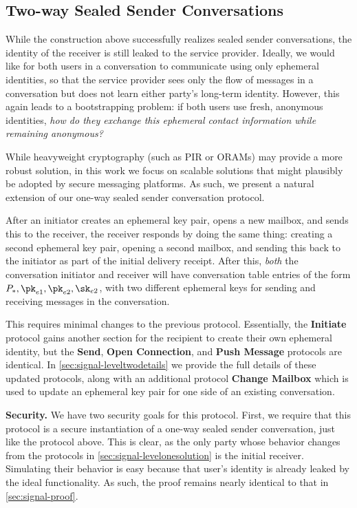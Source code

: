 \subsection{Two-way Sealed Sender Conversations}
\label{sec:signal-leveltwosolution}


While the construction above successfully realizes sealed sender
conversations,
the identity of the receiver is still leaked to
the service provider.  Ideally, we would like for both users in a
conversation to communicate using only ephemeral identities, so that
the service provider sees only the flow of messages in a conversation
but does not learn either party's long-term identity.
However, this again leads to a bootstrapping problem: if
both users use fresh, anonymous identities, {\em how do they exchange
this ephemeral contact information while remaining anonymous?} 

While heavyweight cryptography (such as PIR or ORAMs)
may provide a more robust solution,
in this work we focus on scalable solutions that might plausibly be
adopted by secure messaging platforms.  As such, we present a natural
extension of our one-way sealed sender conversation protocol.

After an initiator creates an ephemeral key pair, opens a new mailbox,
and sends this to the
receiver, the receiver responds by doing the same thing: creating a
second ephemeral key pair, opening a second mailbox, and sending this
back to the initiator as part of the initial delivery receipt. After
this, \emph{both} the conversation initiator and receiver will have
conversation table entries of the form
\(\personx, \pk_{e1}, \pk_{e2}, \sk_{e2}\), with two different ephemeral
keys for sending and receiving messages in the conversation.

This requires minimal changes to the previous protocol. Essentially, the
\textbf{Initiate} protocol gains another section for the recipient to
create their own ephemeral identity, but the \textbf{Send},
\textbf{Open Connection}, and \textbf{Push Message} protocols are identical. In \cref{sec:signal-leveltwodetails}
we provide the full details of these updated protocols, along with an
additional protocol \textbf{Change Mailbox} which is used to update an
ephemeral key pair for one side of an existing conversation.

\medskip \noindent
\textbf{Security.}  We have two security goals for this protocol.  First, we require that this protocol is a secure instantiation of a one-way sealed sender conversation, just like the protocol above.  This is clear, as the only party whose behavior changes from the protocols in
\cref{sec:signal-levelonesolution} is the initial receiver.  Simulating their behavior is easy because that user's identity is already leaked by the ideal
functionality. As such, the proof remains nearly identical to that in
\cref{sec:signal-proof}.

